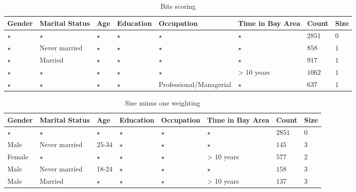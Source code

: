 \documentclass{sig-alternate}
\begin{document}
\begin{table*}
\centering 
\begin{tabular}{| p{1.5cm} | p{1.5cm} | p{1.5cm} | p{1.5cm} | p{1.5cm} | p{1.5cm} | l | l |} 
\hline Gender & Marital Status & Age & Education & Occupation & Time in Bay Area & Count & Size \\ \hline 
\cline{1-8} $\star$ & $\star$ & $\star$ & $\star$ & $\star$ & $\star$ & $2851$ & $0$ \\
\cline{1-1} \cline{2-2} \cline{3-3} \cline{4-4} \cline{5-5} \cline{6-6} \cline{7-8} $\star$ & Never married & $\star$ & $\star$ & $\star$ & $\star$ & $858$ & $1$ \\
\cline{1-1} \cline{2-2} \cline{3-3} \cline{4-4} \cline{5-5} \cline{6-6} \cline{7-8} $\star$ & Married & $\star$ & $\star$ & $\star$ & $\star$ & $917$ & $1$ \\
\cline{1-1} \cline{2-2} \cline{3-3} \cline{4-4} \cline{5-5} \cline{6-6} \cline{7-8} $\star$ & $\star$ & $\star$ & $\star$ & $\star$ & > 10 years & $1062$ & $1$ \\
\cline{1-1} \cline{2-2} \cline{3-3} \cline{4-4} \cline{5-5} \cline{6-6} \cline{7-8} $\star$ & $\star$ & $\star$ & $\star$ & Professional/Managerial & $\star$ & $637$ & $1$ \\
\hline 
\end{tabular} 
\caption{Bits scoring\label{table:weigtingbitwise}} 
\end{table*}

\begin{table*} 
\centering 
\begin{tabular}{| p{1.5cm} | p{1.5cm} | p{1.5cm} | p{1.5cm} | p{1.5cm} | p{1.5cm} | l | l |} 
\hline Gender & Marital Status & Age & Education & Occupation & Time in Bay Area & Count & Size \\ \hline 
\cline{1-8} $\star$ & $\star$ & $\star$ & $\star$ & $\star$ & $\star$ & $2851$ & $0$ \\
\cline{1-1} \cline{2-2} \cline{3-3} \cline{4-4} \cline{5-5} \cline{6-6} \cline{7-8} Male & Never married & 25-34 & $\star$ & $\star$ & $\star$ & $145$ & $3$ \\
\cline{1-1} \cline{2-2} \cline{3-3} \cline{4-4} \cline{5-5} \cline{6-6} \cline{7-8} Female & $\star$ & $\star$ & $\star$ & $\star$ & > 10 years & $577$ & $2$ \\
\cline{1-1} \cline{2-2} \cline{3-3} \cline{4-4} \cline{5-5} \cline{6-6} \cline{7-8} Male & Never married & 18-24 & $\star$ & $\star$ & $\star$ & $158$ & $3$ \\
\cline{1-1} \cline{2-2} \cline{3-3} \cline{4-4} \cline{5-5} \cline{6-6} \cline{7-8} Male & Married & $\star$ & $\star$ & $\star$ & > 10 years & $137$ & $3$ \\
\hline 
\end{tabular} 
\caption{Size minus one weighting \label{table:weightingsizeminusone}} 
\end{table*} 
\end{document}
